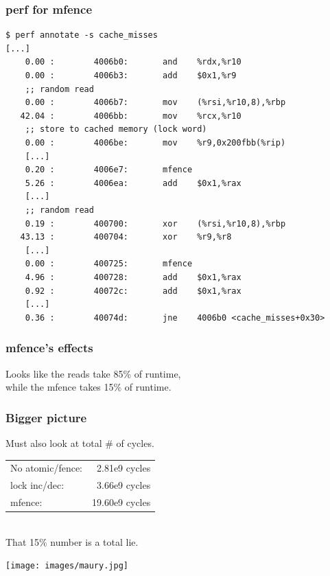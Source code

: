 \begin{frame}[fragile]
  \frametitle{perf for mfence}

  \begin{lstlisting}
$ perf annotate -s cache_misses
[...]
    0.00 :        4006b0:       and    %rdx,%r10
    0.00 :        4006b3:       add    $0x1,%r9
    ;; random read
    0.00 :        4006b7:       mov    (%rsi,%r10,8),%rbp
   42.04 :        4006bb:       mov    %rcx,%r10
    ;; store to cached memory (lock word)
    0.00 :        4006be:       mov    %r9,0x200fbb(%rip)
    [...]
    0.20 :        4006e7:       mfence 
    5.26 :        4006ea:       add    $0x1,%rax
    [...]
    ;; random read
    0.19 :        400700:       xor    (%rsi,%r10,8),%rbp
   43.13 :        400704:       xor    %r9,%r8
    [...]
    0.00 :        400725:       mfence 
    4.96 :        400728:       add    $0x1,%rax
    0.92 :        40072c:       add    $0x1,%rax
    [...]
    0.36 :        40074d:       jne    4006b0 <cache_misses+0x30>
  \end{lstlisting}

\end{frame}

\begin{frame}
  \frametitle{mfence's effects}

  
    Looks like the reads take 85\% of runtime,\\
    while the mfence takes 15\% of runtime.
  

\end{frame}

\begin{frame}
  \frametitle{Bigger picture}

  
    Must also look at total \# of cycles.\\[1em]
    \begin{tabular}{lr}
    No atomic/fence:& 2.81e9 cycles\\
    lock inc/dec: & 3.66e9 cycles\\
    mfence: & 19.60e9 cycles
    \end{tabular}
~\\[1em]
    That 15\% number is a total lie.
  
  \begin{center}
	\texttt{[image: images/maury.jpg]}
\end{center}

\end{frame}


